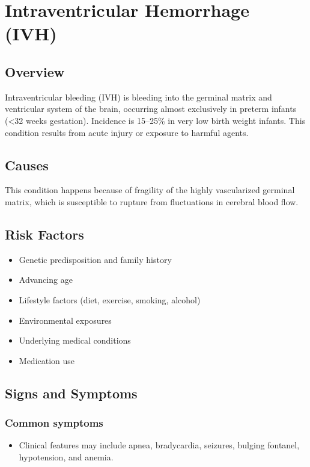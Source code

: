 \chapter{Intraventricular Hemorrhage (IVH)}
\label{sec:Intraventricular Hemorrhage}

\section{Overview}
Intraventricular bleeding (IVH) is bleeding into the germinal matrix and ventricular system of the brain, occurring almost exclusively in preterm infants (<32 weeks gestation). Incidence is 15--25\% in very low birth weight infants. This condition results from acute injury or exposure to harmful agents.
\section{Causes}
This condition happens because of fragility of the highly vascularized germinal matrix, which is susceptible to rupture from fluctuations in cerebral blood flow.     
\section{Risk Factors}

\begin{itemize}[noitemsep]
  \item Genetic predisposition and family history
  \item Advancing age
  \item Lifestyle factors (diet, exercise, smoking, alcohol)
  \item Environmental exposures
  \item Underlying medical conditions
  \item Medication use
\end{itemize}
\section{Signs and Symptoms}

\subsection{Common symptoms}
\begin{itemize}[noitemsep]
  \item Clinical features may include apnea, bradycardia, seizures, bulging fontanel, hypotension, and anemia. 
  \end{itemize}

